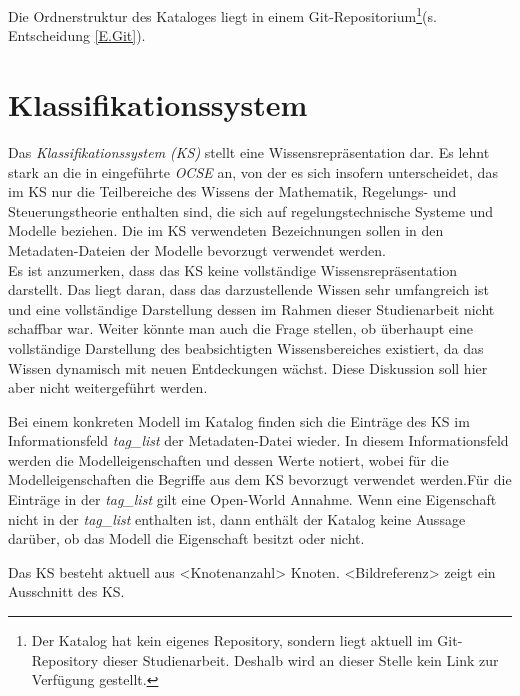 Die Ordnerstruktur des Kataloges liegt in einem Git-Repositorium\footnote{Der Katalog hat kein eigenes Repository, sondern liegt aktuell im Git-Repository dieser Studienarbeit. Deshalb wird an dieser Stelle kein Link zur Verfügung gestellt.}(s. Entscheidung \ref{E.Git}).  %

\section{Klassifikationssystem}
\label{Ch:Ergebnisse:Sec:KS}
Das \textit{Klassifikationssystem (KS)} stellt eine Wissensrepräsentation dar. Es lehnt stark an die in \cite{KNHE20a} eingeführte \textit{OCSE} an, von der es sich insofern unterscheidet, das im KS nur die Teilbereiche des Wissens der Mathematik, Regelungs- und Steuerungstheorie enthalten sind, die sich auf regelungstechnische Systeme und Modelle beziehen. Die im KS verwendeten Bezeichnungen sollen in den Metadaten-Dateien der Modelle bevorzugt verwendet werden. \\
Es ist anzumerken, dass das KS keine vollständige Wissensrepräsentation darstellt. Das liegt daran, dass das darzustellende Wissen sehr umfangreich ist und eine vollständige Darstellung dessen im Rahmen dieser Studienarbeit nicht schaffbar war. Weiter könnte man auch die Frage stellen, ob überhaupt eine vollständige Darstellung des beabsichtigten Wissensbereiches existiert, da das Wissen dynamisch mit neuen Entdeckungen wächst. Diese Diskussion soll hier aber nicht weitergeführt werden. 

Bei einem konkreten Modell im Katalog finden sich die Einträge des KS im Informationsfeld \textit{tag\_list} der Metadaten-Datei wieder. In diesem Informationsfeld werden die Modelleigenschaften und dessen Werte notiert, wobei für die Modelleigenschaften die Begriffe aus dem KS bevorzugt verwendet werden.Für die Einträge in der \textit{tag\_list} gilt eine Open-World Annahme. Wenn eine Eigenschaft nicht in der \textit{tag\_list} enthalten ist, dann enthält der Katalog keine Aussage darüber, ob das Modell die Eigenschaft besitzt oder nicht.

Das KS besteht aktuell aus <Knotenanzahl> Knoten. <Bildreferenz> zeigt ein Ausschnitt des KS.

